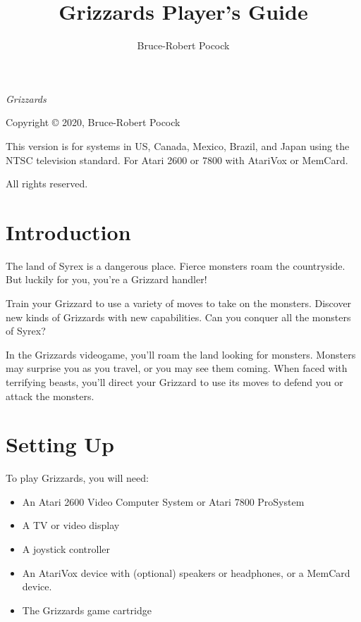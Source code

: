 \documentclass[10pt,twoside,openright]{memoir}
\title{Grizzards Player's Guide}
\author{Bruce-Robert Pocock}
\makeatletter
\newcommand\TV{NTSC}
\newcommand\REGION{US, Canada, Mexico, Brazil, and Japan}
\newcommand\TV{PAL}
\newcommand\REGION{UK and Europe (except France)}
\newcommand\TV{SECAM}
\newcommand\REGION{France, Russia, Africa}
\def\maketitle{%
  \null
  \thispagestyle{empty}%
  \vfill
  \begin{center}\leavevmode
    \normalfont
    {\LARGE\raggedleft \@author\par}%
    \hrulefill\par
    {\huge\raggedright \@title\par}%
    \vskip 1cm
  \end{center}%
  \vfill
  \null
  \cleardoublepage
  }
\makeatother
\begin{document}
\let\cleardoublepage\clearpage


\maketitle

\frontmatter

\null\vfill

\begin{flushleft}
\textit{Grizzards}


Copyright © 2020, Bruce-Robert Pocock

This version is for systems in \REGION{} using the \TV{} television
standard. For Atari 2600 or 7800 with AtariVox or MemCard.




\thedate

\bigskip

All rights reserved.

\end{flushleft}
\let\cleardoublepage\clearpage

\mainmatter

\chapter{Introduction}

The land of Syrex is a dangerous place. Fierce monsters roam the countryside.
But luckily for you, you're a Grizzard handler!

Train your Grizzard to use a variety of moves to take on the monsters.
Discover new kinds of Grizzards with new capabilities. Can you conquer all
the monsters of Syrex?

In the Grizzards videogame, you'll roam the land looking for monsters.
Monsters may surprise you as you travel, or you may see them coming. When
faced with terrifying beasts, you'll direct your Grizzard to use its moves
to defend you or attack the monsters.


\chapter{Setting Up}

To play Grizzards, you will need:

\begin{itemize}
\item An Atari 2600 Video Computer System or Atari 7800 ProSystem
\item A TV or video display
\item A joystick controller
\item  An AtariVox  device with  (optional) speakers  or headphones,  or
  a MemCard device.
\item The Grizzards game cartridge
\end{itemize}
\end{document}

